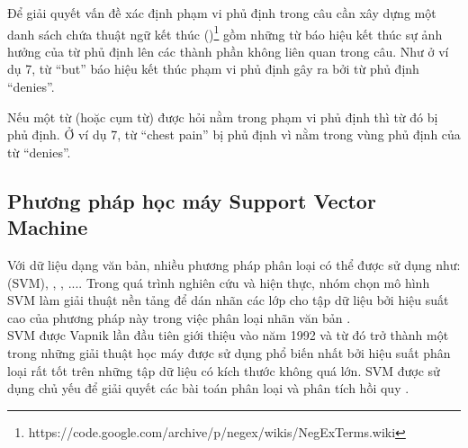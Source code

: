 
Để giải quyết vấn đề xác định phạm vi phủ định trong câu cần xây dựng một danh sách chứa thuật ngữ kết thúc ()\footnote{https://code.google.com/archive/p/negex/wikis/NegExTerms.wiki} gồm những từ báo hiệu kết thúc sự ảnh hưởng của từ phủ định lên các thành phần không liên quan trong câu. Như ở ví dụ 7, từ ``but'' báo hiệu kết thúc phạm vi phủ định gây ra bởi từ phủ định ``denies''.


Nếu một từ (hoặc cụm từ) được hỏi nằm trong phạm vi phủ định thì từ đó bị phủ định. Ở ví dụ 7, từ ``chest pain'' bị phủ định vì nằm trong vùng phủ định của từ ``denies''.

\subsection{Phương pháp học máy Support Vector Machine}
Với dữ liệu dạng văn bản, nhiều phương pháp phân loại có thể được sử dụng như:  (SVM), , , ...\cite{manning2009anintroduction}. Trong quá trình nghiên cứu và hiện thực, nhóm chọn mô hình SVM làm giải thuật nền tảng để dán nhãn các lớp cho tập dữ liệu bởi hiệu suất cao của phương pháp này trong việc phân loại nhãn văn bản \cite{joachims1998text}.\\

SVM được Vapnik lần đầu tiên giới thiệu vào năm 1992 và từ đó trở thành một trong những giải thuật học máy được sử dụng phổ biến nhất bởi hiệu suất phân loại rất tốt trên những tập dữ liệu có kích thước không quá lớn. SVM được sử dụng chủ yếu để giải quyết các bài toán phân loại và phân tích hồi quy \cite{chandrakala2012opinion}\cite{manning2009anintroduction}. \\

